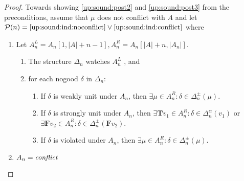 \documentclass{vutinfth} %
\newcommand{\ass}{A}
\newcommand{\bT}{\mathbf{T}}
\newcommand{\bF}{\mathbf{F}}
\newcommand{\sgl}{\mu}
\begin{document}
\begin{proof}
Towards showing \ref{up:sound:post2} and \ref{up:sound:post3} from the preconditions, assume that $\sgl$ does not conflict with $\ass$ and let $\mathcal{P}(n) = \textrm{\ref{up:sound:ind:noconflict}} \vee \textrm{\ref{up:sound:ind:conflict}}$ where

\begin{enumerate}[label=(\Roman*)]
	\item Let $\ass_n^L = \ass_n[1, |A| + n - 1], \ass_n^R = \ass_n[|A| + n, |\ass_n|]$. \label{up:sound:ind:noconflict}
	    \begin{enumerate}[label=(\alph*),ref=\theenumi(\alph*)]
	     \item The structure $\Delta_n$ watches $\ass^L_n$ \label{up:sound:ind:watches}, and
	     \item for each nogood $\delta$ in $\Delta_n$:\label{up:sound:ind:lr}
		\begin{enumerate}[label=(\roman*),ref=\theenumii(\roman*)]
			\item If $\delta$ is weakly unit under $\ass_n$, then $\exists \sgl \in A_n^R : \delta \in \Delta_n^\pm(\sgl)$. \label{up:sound:ind:wu}
			\item If $\delta$ is strongly unit under $\ass_n$, then $\exists {\bT v_1} \in A_n^R : \delta \in \Delta_n^\alpha(v_1)$ or $\exists {\bF v_2} \in A_n^R : \delta \in \Delta_n^\pm({\bF v_2})$. \label{up:sound:ind:su}
			\item If $\delta$ is violated under $\ass_n$, then $\exists \sgl \in A_n^R : \delta \in \Delta_n^\pm(\sgl)$. \label{up:sound:ind:vio}
		\end{enumerate}
	\end{enumerate}
	\item $\ass_n = \emph{conflict}$ \label{up:sound:ind:conflict}
\end{enumerate}


\end{proof}
\end{document}
